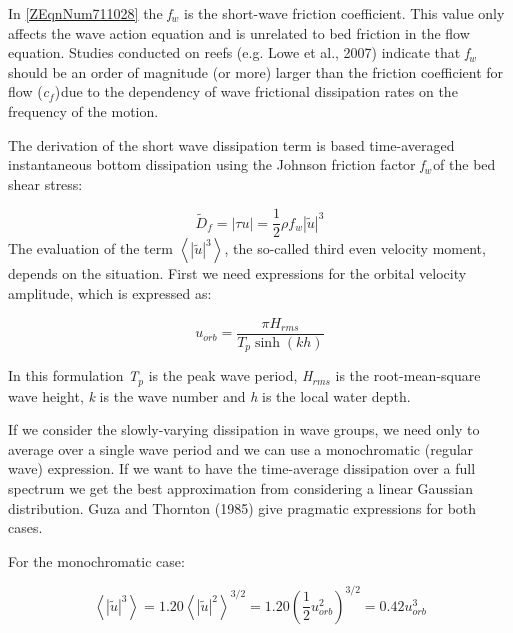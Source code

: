 \documentclass{article}
\begin{document}
\noindent In \eqref{ZEqnNum711028} the \textit{f${}_{w}$} is the short-wave friction coefficient. This value only affects the wave action equation and is unrelated to bed friction in the flow equation. Studies conducted on reefs (e.g. Lowe et al., 2007) indicate that \textit{f${}_{w}$} should be an order of magnitude (or more) larger than the friction coefficient for flow (\textit{c${}_{f}$})${}_{ }$due to the dependency of wave frictional dissipation rates on the frequency of the motion.\textit{}

\noindent 

\noindent The derivation of the short wave dissipation term is based time-averaged instantaneous bottom dissipation using the Johnson friction factor \textit{f${}_{w}$}${}_{ }$of the bed shear stress:

\noindent 
\begin{equation} \label{ZEqnNum889680} 
\tilde{D}_{f} =\left|\tau u\right|=\frac{1}{2} \rho f_{w} \left|\tilde{u}\right|^{3}  
\end{equation} 
The evaluation of the term $\left\langle \left|\tilde{u}\right|^{3} \right\rangle $, the so-called third even velocity moment, depends on the situation. First we need expressions for the orbital velocity amplitude, which is expressed as:

\noindent 
\begin{equation} \label{ZEqnNum105456} 
u_{orb} =\frac{\pi H_{rms} }{T_{p} \sinh (kh)}  
\end{equation} 


\noindent In this formulation \textit{T${}_{p}$} is the peak wave period, \textit{H${}_{rms}$} is the root-mean-square wave height, \textit{k} is the wave number and \textit{h} is the local water depth. 

\noindent 

\noindent If we consider the slowly-varying dissipation in wave groups, we need only to average over a single wave period and we can use a monochromatic (regular wave) expression. If we want to have the time-average dissipation over a full spectrum we get the best approximation from considering a linear Gaussian distribution. Guza and Thornton (1985) give pragmatic expressions for both cases.

\noindent 

\noindent For the monochromatic case:

 
\begin{equation} \label{2.20)} 
\left\langle \left|\tilde{u}\right|^{3} \right\rangle =1.20\left\langle \left|\tilde{u}\right|^{2} \right\rangle ^{3/2} =1.20\left(\frac{1}{2} u_{orb}^{2} \right)^{3/2} =0.42u_{orb}^{3}  
\end{equation} 
\end{document}
